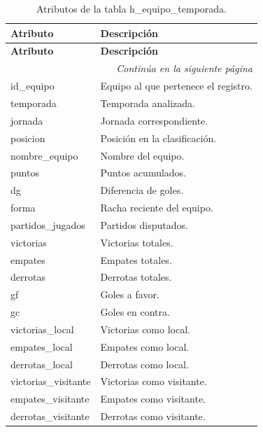 \begin{longtable}{|l|l|}
\caption{Atributos de la tabla h\_equipo\_temporada.} \\

\hline
\textbf{Atributo} & \textbf{Descripción} \\
\hline
\endfirsthead

\hline
\textbf{Atributo} & \textbf{Descripción} \\
\hline
\endhead

\hline
\multicolumn{2}{r}{\textit{Continúa en la siguiente página}} \\
\hline
\endfoot

\hline
\endlastfoot

id\_equipo & Equipo al que pertenece el registro. \\
temporada & Temporada analizada. \\
jornada & Jornada correspondiente. \\
posicion & Posición en la clasificación. \\
nombre\_equipo & Nombre del equipo. \\
puntos & Puntos acumulados. \\
dg & Diferencia de goles. \\
forma & Racha reciente del equipo. \\
partidos\_jugados & Partidos disputados. \\
victorias & Victorias totales. \\
empates & Empates totales. \\
derrotas & Derrotas totales. \\
gf & Goles a favor. \\
gc & Goles en contra. \\
victorias\_local & Victorias como local. \\
empates\_local & Empates como local. \\
derrotas\_local & Derrotas como local. \\
victorias\_visitante & Victorias como visitante. \\
empates\_visitante & Empates como visitante. \\
derrotas\_visitante & Derrotas como visitante. \\
\hline

\end{longtable}

